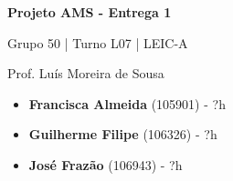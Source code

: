 \documentclass[12pt,a4paper]{article}
\begin{document}
\begin{titlepage}
  \begin{center}
    \vspace*{5cm}

    \Huge
    \textbf{Projeto AMS - Entrega 1}

    \vspace{0.5cm}
    \LARGE
    Grupo 50 | Turno L07 | LEIC-A

    \vspace{0.5cm}
    \large
    Prof. Luís Moreira de Sousa

    \vfill
  \end{center}
  \large
  \begin{itemize}
    \item[] \textbf{Francisca Almeida} (105901) - ?h
    \item[] \textbf{Guilherme Filipe} (106326) - ?h
    \item[] \textbf{José Frazão} (106943) - ?h
  \end{itemize}
\end{titlepage}
\end{document}
